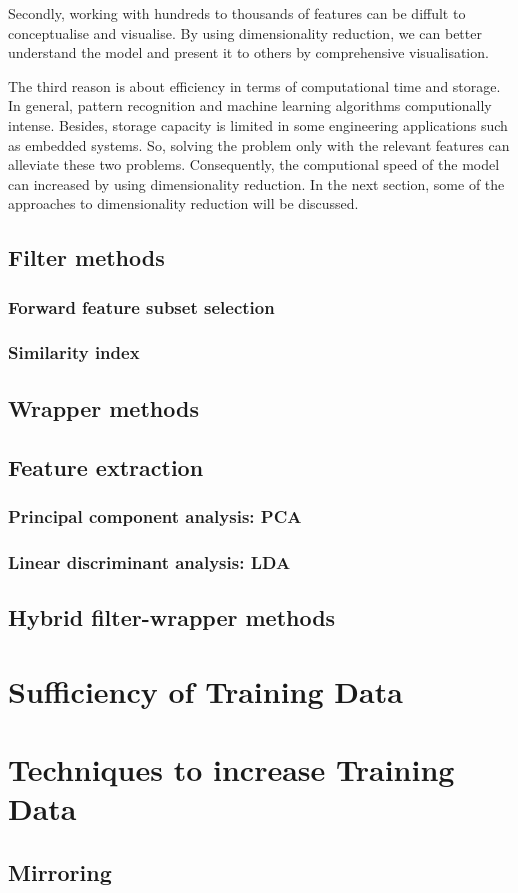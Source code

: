 Secondly, working with hundreds to thousands of features can be diffult to conceptualise and visualise. By using dimensionality reduction, we can better understand the model and present it to others by comprehensive visualisation.%

The third reason is about efficiency in terms of computational time and storage. In general, pattern recognition and machine learning algorithms computionally intense. Besides, storage capacity is limited in some engineering applications such as embedded systems. So, solving the problem only with the relevant features can alleviate these two problems. Consequently, the computional speed of the model can increased by using dimensionality reduction.
In the next section, some of the approaches to dimensionality reduction will be discussed.

\subsection{Filter methods}
\subsubsection{Forward feature subset selection}
\subsubsection{Similarity index}
\subsection{Wrapper methods}
\subsection{Feature extraction}
\subsubsection{Principal component analysis: PCA}
\subsubsection{Linear discriminant analysis: LDA}

\subsection{Hybrid filter-wrapper methods}

\section{Sufficiency of Training Data}
\section{Techniques to increase Training Data}
\subsection{Mirroring}